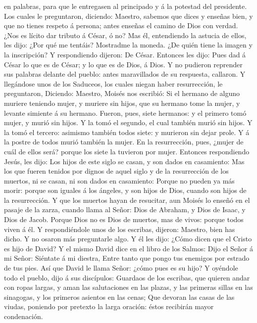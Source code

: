 en palabras, para que le entregasen al principado y á la potestad del
presidente.  Los cuales le preguntaron, diciendo: Maestro,
sabemos que dices y enseñas bien, y que no tienes respeto á persona;
antes enseñas el camino de Dios con verdad.  ¿Nos es lícito
dar tributo á César, ó no?  Mas él, entendiendo la astucia
de ellos, les dijo: ¿Por qué me tentáis?  Mostradme la
moneda. ¿De quién tiene la imagen y la inscripción? Y respondiendo
dijeron: De César.  Entonces les dijo: Pues dad á César lo
que es de César; y lo que es de Dios, á Dios.  Y no
pudieron reprender sus palabras delante del pueblo: antes maravillados
de su respuesta, callaron.  Y llegándose unos de los
Saduceos, los cuales niegan haber resurrección, le preguntaron,
 Diciendo: Maestro, Moisés nos escribió: Si el hermano de
alguno muriere teniendo mujer, y muriere sin hijos, que su hermano tome
la mujer, y levante simiente á su hermano.  Fueron, pues,
siete hermanos: y el primero tomó mujer, y murió sin hijos.
 Y la tomó el segundo, el cual también murió sin hijos.
 Y la tomó el tercero: asimismo también todos siete: y
murieron sin dejar prole.  Y á la postre de todos murió
también la mujer.  En la resurrección, pues, ¿mujer de cuál
de ellos será? porque los siete la tuvieron por mujer. 
Entonces respondiendo Jesús, les dijo: Los hijos de este siglo se casan,
y son dados en casamiento:  Mas los que fueren tenidos por
dignos de aquel siglo y de la resurrección de los muertos, ni se casan,
ni son dados en casamiento:  Porque no pueden ya más morir:
porque son iguales á los ángeles, y son hijos de Dios, cuando son hijos
de la resurrección.  Y que los muertos hayan de resucitar,
aun Moisés lo enseñó en el pasaje de la zarza, cuando llama al Señor:
Dios de Abraham, y Dios de Isaac, y Dios de Jacob.  Porque
Dios no es Dios de muertos, mas de vivos: porque todos viven á él.
 Y respondiéndole unos de los escribas, dijeron: Maestro,
bien has dicho.  Y no osaron más preguntarle algo.
 Y él les dijo: ¿Cómo dicen que el Cristo es hijo de David?
 Y el mismo David dice en el libro de los Salmos: Dijo el
Señor á mi Señor: Siéntate á mi diestra,  Entre tanto que
pongo tus enemigos por estrado de tus pies.  Así que David
le llama Señor: ¿cómo pues es su hijo?  Y oyéndole todo el
pueblo, dijo á sus discípulos:  Guardaos de los escribas,
que quieren andar con ropas largas, y aman las salutaciones en las
plazas, y las primeras sillas en las sinagogas, y los primeros asientos
en las cenas;  Que devoran las casas de las viudas,
poniendo por pretexto la larga oración: éstos recibirán mayor
condenación.

